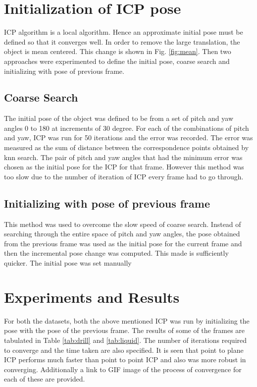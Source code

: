 \documentclass[letterpaper, 10 pt, conference]{ieeeconf}  %
\begin{document}
\section{Initialization of ICP pose}
\label{sec:init}
ICP algorithm is a local algorithm. Hence an approximate initial pose must be defined so that it converges well. In order to remove the large translation, the object is mean centered. This change is shown in Fig. \ref{fig:mean}. Then two approaches were experimented to define the initial pose, coarse search and initializing with pose of previous frame.
\subsection*{Coarse Search}
The initial pose of the object was defined to be from a set of pitch and yaw angles 0 to 180 at increments of 30 degree. For each of the combinations of pitch and yaw, ICP was run for 50 iterations and the error was recorded. The error was measured as the sum of distance between the correspondence points obtained by knn search. The pair of pitch and yaw angles that had the minimum error was chosen as the initial pose for the ICP for that frame. However this method was too slow due to the number of iteration of ICP every frame had to go through.
\subsection*{Initializing with pose of previous frame}
This method was used to overcome the slow speed of coarse search. Instead of searching through the entire space of pitch and yaw angles, the pose obtained from the previous frame was used as the initial pose for the current frame and then the incremental pose change was computed. This made is sufficiently quicker. The initial pose was set manually

\section{Experiments and Results}
\label{sec:exp}
For both the datasets, both the above mentioned ICP was run by initializing the pose with the pose of the previous frame. The results of some of the frames are tabulated in Table \ref{tab:drill} and \ref{tab:liquid}. The number of iterations required to converge and the time taken are also specified. It is seen that point to plane ICP performs much faster than point to point ICP and also was more robust in converging. Additionally a link to GIF image of the process of convergence for each of these are provided.
\end{document}
